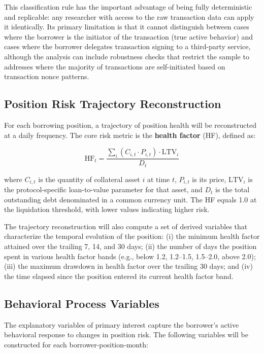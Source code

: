 This classification rule has the important advantage of being fully deterministic and replicable: any researcher with access to the raw transaction data can apply it identically. Its primary limitation is that it cannot distinguish between cases where the borrower is the initiator of the transaction (true active behavior) and cases where the borrower delegates transaction signing to a third-party service, although the analysis can include robustness checks that restrict the sample to addresses where the majority of transactions are self-initiated based on transaction nonce patterns.

\subsection{Position Risk Trajectory Reconstruction}

For each borrowing position, a trajectory of position health will be reconstructed at a daily frequency. The core risk metric is the \textbf{health factor} (HF), defined as:

\begin{equation}
\text{HF}_t = \frac{\sum_{i} (C_{i,t} \cdot P_{i,t}) \cdot \text{LTV}_i}{D_t}
\end{equation}

where \(C_{i,t}\) is the quantity of collateral asset \(i\) at time \(t\), \(P_{i,t}\) is its price, \(\text{LTV}_i\) is the protocol-specific loan-to-value parameter for that asset, and \(D_t\) is the total outstanding debt denominated in a common currency unit. The HF equals 1.0 at the liquidation threshold, with lower values indicating higher risk.

The trajectory reconstruction will also compute a set of derived variables that characterize the temporal evolution of the position: (i) the minimum health factor attained over the trailing 7, 14, and 30 days; (ii) the number of days the position spent in various health factor bands (e.g., below 1.2, 1.2--1.5, 1.5--2.0, above 2.0); (iii) the maximum drawdown in health factor over the trailing 30 days; and (iv) the time elapsed since the position entered its current health factor band.

\subsection{Behavioral Process Variables}

The explanatory variables of primary interest capture the borrower's active behavioral response to changes in position risk. The following variables will be constructed for each borrower-position-month:

